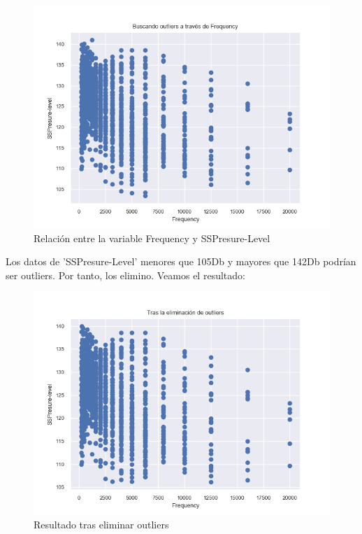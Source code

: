 \begin{figure}[H] %
	\centering
	\includegraphics[scale=0.6]{freq-ssp.png}  %
	\caption{Relación entre la variable Frequency y SSPresure-Level} 
	\label{fig:freq-ssp}
\end{figure}

Los datos de 'SSPresure-Level' menores que 105Db y mayores que 142Db podrían ser  outliers. Por tanto, los elimino. Veamos el resultado:

\begin{figure}[H] %
	\centering
	\includegraphics[scale=0.6]{sin-out-air.png}  %
	\caption{Resultado tras eliminar outliers} 
	\label{fig:sin-out}
\end{figure}

